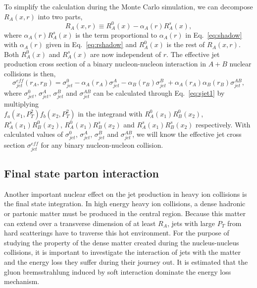        To simplify the calculation during the Monte Carlo 
simulation, we can decompose $R_A(x,r)$ into two parts,
\begin{equation}
        R_A(x,r)\equiv R_A^0(x)-\alpha_A(r)R_A^s(x),
\end{equation}
where $\alpha_A(r)R_A^s(x)$ is the term proportional to $\alpha_A(r)$ 
in Eq.~\ref{eq:shadow} with  $\alpha_A(r)$ given in Eq.~\ref{eq:rshadow} 
and $R_A^0(x)$ is the rest of $R_A(x,r)$. Both $R_A^0(x)$ and $R_A^s(x)$ 
are now independent of $r$. The effective jet production cross section
of a binary nucleon-nucleon  interaction in $A+B$ nuclear collisions 
is then,
\begin{equation}
        \sigma_{jet}^{eff}(r_A,r_B)=\sigma_{jet}^0-\alpha_A(r_A)\sigma_{jet}^A
                -\alpha_B(r_B)\sigma_{jet}^B
                +\alpha_A(r_A)\alpha_B(r_B)\sigma_{jet}^{AB},\label{eq:sjetab}
\end{equation}
where $\sigma_{jet}^0$, $\sigma_{jet}^A$, $\sigma_{jet}^B$ and
$\sigma_{jet}^{AB}$ can be calculated through Eq.~\ref{eq:sjet1} by 
multiplying \\
$f_a(x_1,P_T^2)f_b(x_2,P_T^2)$ in the integrand with 
$R_A^0(x_1)R_B^0(x_2)$, $R_A^s(x_1)R_B^0(x_2)$, $R_A^0(x_1)R_B^s(x_2)$ and 
$R_A^s(x_1)R_B^s(x_2)$ respectively. With calculated values of
$\sigma_{jet}^0$, $\sigma_{jet}^A$, $\sigma_{jet}^B$ and $\sigma_{jet}^{AB}$,
we will know the effective jet cross section
$\sigma_{jet}^{eff}$ for any binary nucleon-nucleon collision.



\subsection{Final state parton interaction}



        Another important nuclear effect on the jet 
production in heavy ion collisions is the final state 
integration. In  high energy heavy ion collisions, a dense
hadronic or partonic matter must be produced in the central 
region. Because this matter can extend over a transverse 
dimension of at least $R_A$, jets with large $P_T$ from 
hard scatterings have to traverse this hot environment. For 
the purpose of studying the property of the dense matter 
created during the nucleus-nucleus collisions, it is 
important to investigate the interaction of jets with the 
matter and the energy loss they suffer during their
journey out. It is estimated\cite{gyu92,dedx} that the gluon 
bremsstrahlung induced by soft interaction dominate the 
energy loss mechanism.

